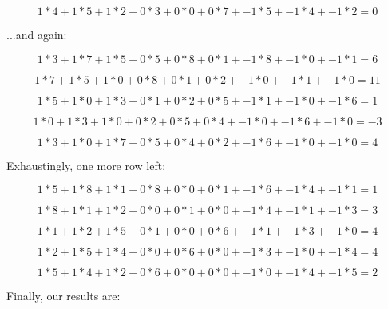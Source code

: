\documentclass{article}
\begin{document}
\begin{equation}
    1*4 + 1*5 + 1*2 + 0*3 + 0*0 + 0*7 + -1*5 + -1*4 + -1*2 = 0
\end{equation}

\noindent ...and again:

\begin{equation}
    1*3 + 1*7 + 1*5 + 0*5 + 0*8 + 0*1 + -1*8 + -1*0 + -1*1 = 6
\end{equation}

\begin{equation}
    1*7 + 1*5 + 1*0 + 0*8 + 0*1 + 0*2 + -1*0 + -1*1 + -1*0 = 11
\end{equation}

\begin{equation}
    1*5 + 1*0 + 1*3 + 0*1 + 0*2 + 0*5 + -1*1 + -1*0 + -1*6 = 1
\end{equation}

\begin{equation}
    1*0 + 1*3 + 1*0 + 0*2 + 0*5 + 0*4 + -1*0 + -1*6 + -1*0 = -3
\end{equation}

\begin{equation}
    1*3 + 1*0 + 1*7 + 0*5 + 0*4 + 0*2 + -1*6 + -1*0 + -1*0 = 4
\end{equation}

\noindent Exhaustingly, one more row left:

\begin{equation}
    1*5 + 1*8 + 1*1 + 0*8 + 0*0 + 0*1 + -1*6 + -1*4 + -1*1 = 1
\end{equation}

\begin{equation}
    1*8 + 1*1 + 1*2 + 0*0 + 0*1 + 0*0 + -1*4 + -1*1 + -1*3 = 3
\end{equation}

\begin{equation}
    1*1 + 1*2 + 1*5 + 0*1 + 0*0 + 0*6 + -1*1 + -1*3 + -1*0 = 4
\end{equation}

\begin{equation}
    1*2 + 1*5 + 1*4 + 0*0 + 0*6 + 0*0 + -1*3 + -1*0 + -1*4 = 4
\end{equation}

\begin{equation}
    1*5 + 1*4 + 1*2 + 0*6 + 0*0 + 0*0 + -1*0 + -1*4 + -1*5 = 2
\end{equation}

\noindent Finally, our results are:
\end{document}

